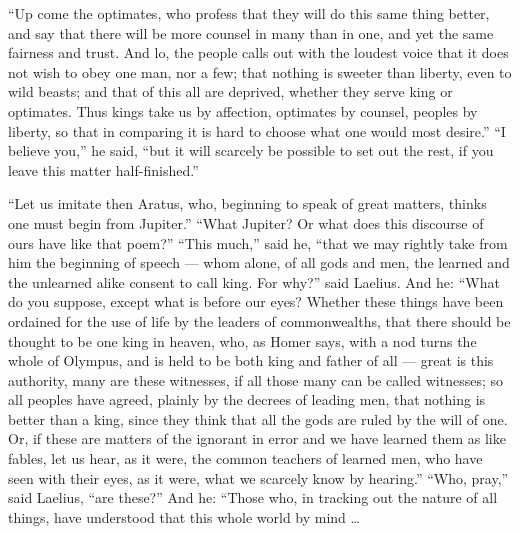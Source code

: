  ``Up come the optimates, who profess that they will do this same thing better, and say that there will be more counsel in many than in one, and yet the same fairness and trust. And lo, the people calls out with the loudest voice that it does not wish to obey one man, nor a few; that nothing is sweeter than liberty, even to wild beasts; and that of this all are deprived, whether they serve king or optimates. Thus kings take us by affection, optimates by counsel, peoples by liberty, so that in comparing it is hard to choose what one would most desire.'' ``I believe you,'' he said, ``but it will scarcely be possible to set out the rest, if you leave this matter half-finished.''

 ``Let us imitate then Aratus, who, beginning to speak of great matters, thinks one must begin from Jupiter.'' ``What Jupiter? Or what does this discourse of ours have like that poem?'' ``This much,'' said he, ``that we may rightly take from him the beginning of speech --- whom alone, of all gods and men, the learned and the unlearned alike consent to call king. For why?'' said Laelius. And he: ``What do you suppose, except what is before our eyes? Whether these things have been ordained for the use of life by the leaders of commonwealths, that there should be thought to be one king in heaven, who, as Homer says, with a nod turns the whole of Olympus, and is held to be both king and father of all --- great is this authority, many are these witnesses, if all those many can be called witnesses; so all peoples have agreed, plainly by the decrees of leading men, that nothing is better than a king, since they think that all the gods are ruled by the will of one. Or, if these are matters of the ignorant in error and we have learned them as like fables, let us hear, as it were, the common teachers of learned men, who have seen with their eyes, as it were, what we scarcely know by hearing.'' ``Who, pray,'' said Laelius, ``are these?'' And he: ``Those who, in tracking out the nature of all things, have understood that this whole world by mind \ldots

